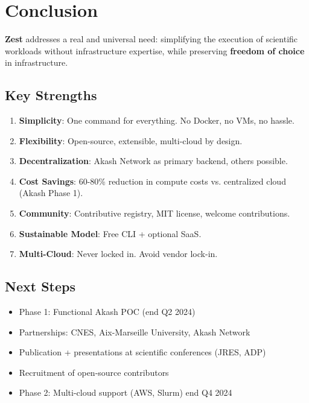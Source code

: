 \documentclass[11pt,a4paper]{article}
\newcommand{\highlight}[1]{\textbf{\color{darkblue}#1}}
\begin{document}
	\newpage
	
	\section{Conclusion}
	
	\highlight{Zest} addresses a real and universal need: simplifying the execution of scientific workloads without infrastructure expertise, while preserving \textbf{freedom of choice} in infrastructure.
	
	\subsection{Key Strengths}
	
	\begin{enumerate}
		\item \textbf{Simplicity}: One command for everything. No Docker, no VMs, no hassle.
		\item \textbf{Flexibility}: Open-source, extensible, multi-cloud by design.
		\item \textbf{Decentralization}: Akash Network as primary backend, others possible.
		\item \textbf{Cost Savings}: 60-80\% reduction in compute costs vs. centralized cloud (Akash Phase 1).
		\item \textbf{Community}: Contributive registry, MIT license, welcome contributions.
		\item \textbf{Sustainable Model}: Free CLI + optional SaaS.
		\item \textbf{Multi-Cloud}: Never locked in. Avoid vendor lock-in.
	\end{enumerate}
	
	\subsection{Next Steps}
	
	\begin{itemize}
		\item Phase 1: Functional Akash POC (end Q2 2024)
		\item Partnerships: CNES, Aix-Marseille University, Akash Network
		\item Publication + presentations at scientific conferences (JRES, ADP)
		\item Recruitment of open-source contributors
		\item Phase 2: Multi-cloud support (AWS, Slurm) end Q4 2024
	\end{itemize}
	
\end{document}
